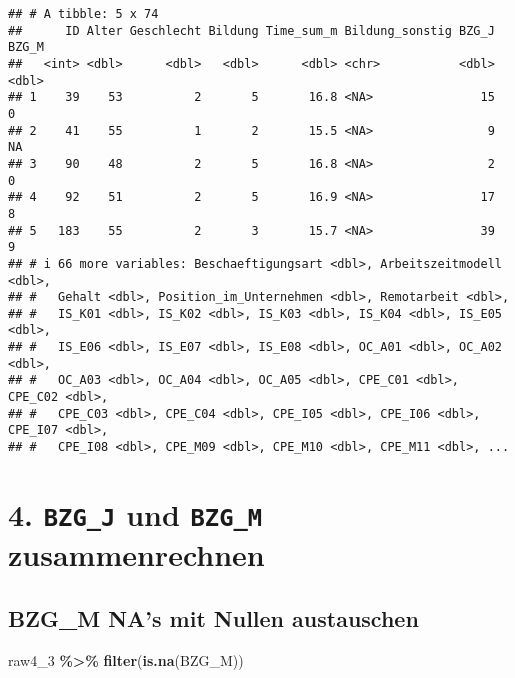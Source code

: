 \documentclass[
]{article}
\newenvironment{Shaded}{\begin{snugshade}}{\end{snugshade}}
\newcommand{\FunctionTok}[1]{\textcolor[rgb]{0.13,0.29,0.53}{\textbf{#1}}}
\newcommand{\NormalTok}[1]{#1}
\newcommand{\SpecialCharTok}[1]{\textcolor[rgb]{0.81,0.36,0.00}{\textbf{#1}}}
\begin{document}
\begin{verbatim}
## # A tibble: 5 x 74
##      ID Alter Geschlecht Bildung Time_sum_m Bildung_sonstig BZG_J BZG_M
##   <int> <dbl>      <dbl>   <dbl>      <dbl> <chr>           <dbl> <dbl>
## 1    39    53          2       5       16.8 <NA>               15     0
## 2    41    55          1       2       15.5 <NA>                9    NA
## 3    90    48          2       5       16.8 <NA>                2     0
## 4    92    51          2       5       16.9 <NA>               17     8
## 5   183    55          2       3       15.7 <NA>               39     9
## # i 66 more variables: Beschaeftigungsart <dbl>, Arbeitszeitmodell <dbl>,
## #   Gehalt <dbl>, Position_im_Unternehmen <dbl>, Remotarbeit <dbl>,
## #   IS_K01 <dbl>, IS_K02 <dbl>, IS_K03 <dbl>, IS_K04 <dbl>, IS_E05 <dbl>,
## #   IS_E06 <dbl>, IS_E07 <dbl>, IS_E08 <dbl>, OC_A01 <dbl>, OC_A02 <dbl>,
## #   OC_A03 <dbl>, OC_A04 <dbl>, OC_A05 <dbl>, CPE_C01 <dbl>, CPE_C02 <dbl>,
## #   CPE_C03 <dbl>, CPE_C04 <dbl>, CPE_I05 <dbl>, CPE_I06 <dbl>, CPE_I07 <dbl>,
## #   CPE_I08 <dbl>, CPE_M09 <dbl>, CPE_M10 <dbl>, CPE_M11 <dbl>, ...
\end{verbatim}

\section{\texorpdfstring{4. \texttt{BZG\_J} und \texttt{BZG\_M}
zusammenrechnen}{4. BZG\_J und BZG\_M zusammenrechnen}}\label{bzg_j-und-bzg_m-zusammenrechnen}

\subsection{BZG\_M NA's mit Nullen
austauschen}\label{bzg_m-nas-mit-nullen-austauschen}

\begin{Shaded}
\begin{Highlighting}[]
\NormalTok{raw4\_3 }\SpecialCharTok{\%\textgreater{}\%} 
  \FunctionTok{filter}\NormalTok{(}\FunctionTok{is.na}\NormalTok{(BZG\_M))}
\end{Highlighting}
\end{Shaded}
\end{document}
